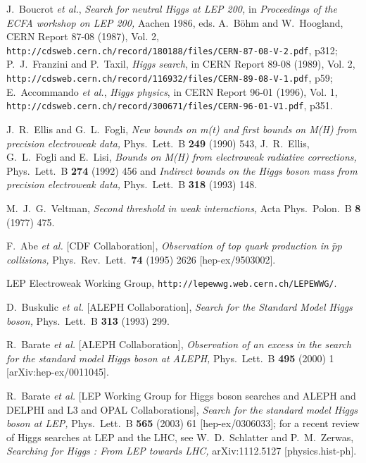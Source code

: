 \documentclass[12pt]{article}
\numberwithin{equation}{section}
\begin{document}
\begin{thebibliography}{99}
J.~Boucrot {\it et al.},
{\it Search for neutral Higgs at LEP 200,} in {\it Proceedings of the ECFA workshop on LEP 200,} Aachen 1986, eds. A.~B\"ohm and W.~Hoogland,
CERN Report 87-08 (1987), Vol. 2,
{\tt http://cdsweb.cern.ch/record/180188/files/CERN-87-08-V-2.pdf}, p312; \\
P.~J.~Franzini and P.~Taxil, {\it Higgs search}, in
CERN Report 89-08 (1989), Vol. 2,
{\tt http://cdsweb.cern.ch/record/116932/files/CERN-89-08-V-1.pdf}, p59; \\
E.~Accommando {\it et al.}, {\it Higgs physics}, in
CERN Report 96-01 (1996), Vol. 1,
{\tt http://cdsweb.cern.ch/record/300671/files/CERN-96-01-V1.pdf}, p351.

J.~R.~Ellis and G.~L.~Fogli,
{\it New bounds on m(t) and first bounds on M(H) from precision electroweak data,}
  Phys.\ Lett.\ B {\bf 249} (1990) 543,
  J.~R.~Ellis, G.~L.~Fogli and E.~Lisi,
{\it Bounds on M(H) from electroweak radiative corrections,}
  Phys.\ Lett.\ B {\bf 274} (1992) 456 and
{\it Indirect bounds on the Higgs boson mass from precision electroweak data,}
  Phys.\ Lett.\ B {\bf 318} (1993) 148.
  
M.~J.~G.~Veltman,
{\it Second threshold in weak interactions,}
  Acta Phys.\ Polon.\ B {\bf 8} (1977) 475.

F.~Abe {\it et al.}  [CDF Collaboration],
{\it Observation of top quark production in $\bar{p}p$ collisions,}
  Phys.\ Rev.\ Lett.\  {\bf 74} (1995) 2626
  [hep-ex/9503002].
  
LEP Electroweak Working Group, {\tt http://lepewwg.web.cern.ch/LEPEWWG/}.

D.~Buskulic {\it et al.}  [ALEPH Collaboration],
{\it Search for the Standard Model Higgs boson,}
  Phys.\ Lett.\  B {\bf 313} (1993) 299.
  
R.~Barate {\it et al.}  [ALEPH Collaboration],
{\it Observation of an excess in the search for the standard model Higgs  boson
at ALEPH,}
  Phys.\ Lett.\  B {\bf 495} (2000) 1
  [arXiv:hep-ex/0011045].
  
R.~Barate {\it et al.}  [LEP Working Group for Higgs boson searches and ALEPH and DELPHI and L3 and OPAL Collaborations],
{\it Search for the standard model Higgs boson at LEP,}
  Phys.\ Lett.\ B {\bf 565} (2003) 61
  [hep-ex/0306033];
  for a recent review of Higgs searches at LEP and the LHC, see
  W.~D.~Schlatter and P.~M.~Zerwas,
{\it Searching for Higgs : From LEP towards LHC,}
  arXiv:1112.5127 [physics.hist-ph].
  

\end{thebibliography}
\end{document}
